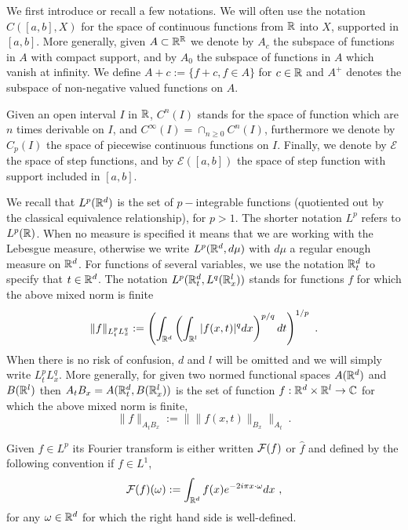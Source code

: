 We first introduce or recall a few notations. We will often use the notation $C([a,b],X)$ for the space of continuous functions from $\mathbb{R}$ into $X$, supported  in $[a,b]$. More generally, given $A\subset \mathbb{R}^{\mathbb{R}}$ we denote by $A_c$ the subspace of functions in $A$ with compact support, and by $A_0$ the subspace of functions in $A$ which vanish at infinity. We define $A+c:=\{f+c, f\in A\}$ for $c\in\mathbb{R}$ and $A^+$ denotes the subspace of non-negative valued functions on $A$.

Given an open interval $I$ in $\mathbb{R}$, $C^n(I)$ stands for the space of function which are $n$ times derivable on $I$, and $C^\infty(I) = \cap_{n\geqslant 0} C^n(I)$, furthermore we denote  by $C_p(I)$ the space of piecewise continuous functions on $I$. Finally, we denote by $\mathcal{E}$ the space of step functions, and by $\mathcal{E}([a,b])$ the space of step function with support included in $[a,b]$.

We recall that $L^p(\mathbb{R}^d)$ is the set of $p-$integrable functions (quotiented out by the classical equivalence relationship), for $p>1$. The shorter notation $L^p$ refers to $L^p(\mathbb{R})$. When no measure is specified it means that we are working with the Lebesgue measure, otherwise we write $L^p(\mathbb{R}^d, d\mu)$ with $d\mu$ a regular enough measure on $\mathbb{R}^d$. For functions of several variables, we use the notation  $\mathbb{R}^d_t$ to specify that $t\in\mathbb{R}^d$. The notation $L^p(\mathbb{R}^d_t, L^q(\mathbb{R}^l_x))$ stands for functions $f$ for which the above mixed norm is finite
\begin{equation}
    \|f\|_{L^p_t L^q_x} := \left( \int_{\mathbb{R}^d}\left(\int_{\mathbb{R}^l} |f(x,t)|^q dx \right)^{p/q} dt \right)^{1/p}\ .
\end{equation}
When there is no risk of confusion, $d$ and $l$ will be omitted and we will simply write $L^p_t L^q_x$. More generally, for given two normed functional spaces $A(\mathbb{R}^d)$ and $B(\mathbb{R}^l)$ then $A_t B_x = A(\mathbb{R}^d_t,B(\mathbb{R}^l_x))$ is the set of function $f:\mathbb{R}^d\times\mathbb{R}^l\rightarrow\mathbb{C}$ for which the above mixed norm is finite,
\begin{equation}
    \|f\|_{A_t B_x} := \|\|f(x,t)\|_{B_x} \|_{A_t}\ .
\end{equation}

Given $f\in L^p$ its Fourier transform is either written $\mathcal{F}(f)$ or $\hat{f}$ and defined by the following convention if $f\in L^1$,
\begin{equation}
    \mathcal{F}(f)(\omega) := \int_{\mathbb{R}^d} f(x)e^{-2i\pi x\cdot\omega} dx\ ,
\end{equation}
for any $\omega\in\mathbb{R}^d$ for which the right hand side is well-defined.

